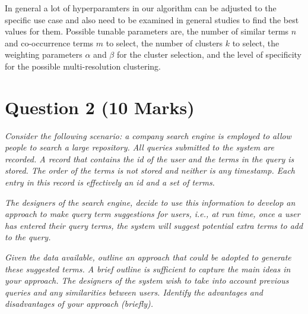 In general a lot of hyperparamters in our algorithm can be adjusted to the specific use case and also need to be examined in general studies to find the best values for them. Possible tunable parameters are, the number of similar terms $n$ and co-occurrence terms $m$ to select, the number of clusters $k$ to select, the weighting parameters $\alpha$ and $\beta$ for the cluster selection, and the level of specificity for the possible multi-resolution clustering.


\newpage
\section{Question 2 (10 Marks)}

\textit{Consider the following scenario: a company search engine is employed to allow people to search a large repository. All queries submitted to the system are recorded. A record that contains the id of the user and the terms in the query is stored. The order of the terms is not stored and neither is any timestamp. Each entry in this record is effectively an id and a set of terms.}

\textit{The designers of the search engine, decide to use this information to develop an approach to make query term suggestions for users, i.e., at run time, once a user has entered their query terms, the system will suggest potential extra terms to add to the query.}

\textit{Given the data available, outline an approach that could be adopted to generate these suggested terms. A brief outline is sufficient to capture the main ideas in your approach. The designers of the system wish to take into account previous queries and any similarities between users. Identify the advantages and disadvantages of your approach (briefly).}









